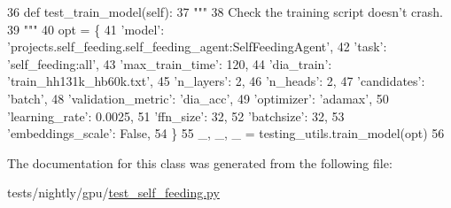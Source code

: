 \begin{DoxyCode}
36     \textcolor{keyword}{def }test\_train\_model(self):
37         \textcolor{stringliteral}{"""}
38 \textcolor{stringliteral}{        Check the training script doesn't crash.}
39 \textcolor{stringliteral}{        """}
40         opt = \{
41             \textcolor{stringliteral}{'model'}: \textcolor{stringliteral}{'projects.self\_feeding.self\_feeding\_agent:SelfFeedingAgent'},
42             \textcolor{stringliteral}{'task'}: \textcolor{stringliteral}{'self\_feeding:all'},
43             \textcolor{stringliteral}{'max\_train\_time'}: 120,
44             \textcolor{stringliteral}{'dia\_train'}: \textcolor{stringliteral}{'train\_hh131k\_hb60k.txt'},
45             \textcolor{stringliteral}{'n\_layers'}: 2,
46             \textcolor{stringliteral}{'n\_heads'}: 2,
47             \textcolor{stringliteral}{'candidates'}: \textcolor{stringliteral}{'batch'},
48             \textcolor{stringliteral}{'validation\_metric'}: \textcolor{stringliteral}{'dia\_acc'},
49             \textcolor{stringliteral}{'optimizer'}: \textcolor{stringliteral}{'adamax'},
50             \textcolor{stringliteral}{'learning\_rate'}: 0.0025,
51             \textcolor{stringliteral}{'ffn\_size'}: 32,
52             \textcolor{stringliteral}{'batchsize'}: 32,
53             \textcolor{stringliteral}{'embeddings\_scale'}: \textcolor{keyword}{False},
54         \}
55         \_, \_, \_ = testing\_utils.train\_model(opt)
56 
\end{DoxyCode}


The documentation for this class was generated from the following file\+:\begin{DoxyCompactItemize}
\item 
tests/nightly/gpu/\hyperlink{test__self__feeding_8py}{test\+\_\+self\+\_\+feeding.\+py}\end{DoxyCompactItemize}
